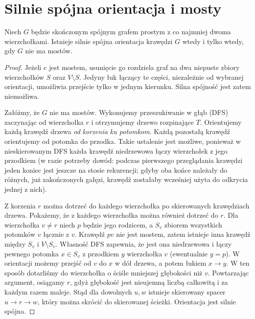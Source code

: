 \section{Silnie spójna orientacja i mosty}
\label{sec:tg-robbins}

\begin{twierdzenie}[Robbins]
\label{thm:tg-robbins}
Niech $G$ będzie skończonym spójnym grafem prostym
z co najmniej dwoma wierzchołkami. Istnieje silnie spójna
orientacja krawędzi $G$ wtedy i tylko wtedy,
gdy $G$ nie ma mostów.
\end{twierdzenie}

\begin{proof}
Jeżeli $e$ jest mostem, usunięcie go rozdziela graf na dwa
niepuste zbiory wierzchołków $S$ oraz $V\setminus S$.
Jedyny łuk łączący te części, niezależnie od wybranej
orientacji, umożliwia przejście tylko w jednym kierunku.
Silna spójność jest zatem niemożliwa.

Załóżmy, że $G$ nie ma mostów. Wykonujemy przeszukiwanie
w głąb (DFS) zaczynając od wierzchołka $r$ i otrzymujemy
drzewo rozpinające $T$. Orientujemy każdą krawędź drzewa
\emph{od korzenia ku potomkom}. Każdą pozostałą krawędź
orientujemy od potomka do przodka. Takie ustalenie
jest możliwe, ponieważ w nieskierowanym DFS każda
krawędź niedrzewowa łączy wierzchołek z jego przodkiem
(w razie potrzeby dowód: podczas pierwszego przeglądania
krawędzi jeden koniec jest jeszcze na stosie rekurencji;
gdyby oba końce należały do różnych, już zakończonych gałęzi,
krawędź zostałaby wcześniej użyta do odkrycia jednej z nich).

Z korzenia $r$ można dotrzeć do każdego wierzchołka
po skierowanych krawędziach drzewa. Pokażemy, że
z każdego wierzchołka można również dotrzeć do $r$.
Dla wierzchołka $v\ne r$ niech $p$ będzie jego rodzicem,
a $S_v$ zbiorem wszystkich potomków $v$ łącznie z $v$.
Krawędź $pv$ nie jest mostem, zatem istnieje inna krawędź
między $S_v$ i $V\setminus S_v$. Własność DFS zapewnia,
że jest ona niedrzewowa i łączy pewnego potomka $x\in S_v$
z przodkiem $y$ wierzchołka $v$ (ewentualnie $y=p$).
W orientacji możemy przejść od $v$ do $x$ w dół drzewa,
a potem łukiem $x\to y$. W ten sposób dotarliśmy do
wierzchołka o ściśle mniejszej głębokości niż $v$.
Powtarzając argument, osiągamy $r$, gdyż głębokość
jest nieujemną liczbą całkowitą i za każdym razem maleje.
Stąd dla dowolnych $u,w$ istnieje skierowany spacer
$u\to r\to w$, który można skrócić do skierowanej
ścieżki. Orientacja jest silnie spójna.
\end{proof}

